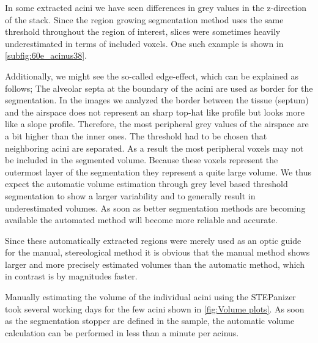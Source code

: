 \documentclass[paper=a4,twocolumn=true,DIV=calc,abstract,english]{scrartcl}
\begin{document}
In some extracted acini we have seen differences in grey values in the z-direction of the stack.
Since the region growing segmentation method uses the same threshold throughout the region of interest, slices were sometimes heavily underestimated in terms of included voxels. One such example is shown in \autoref{subfig:60e_acinus38}.

Additionally, we might see the so-called edge-effect, which can be explained as follows; 
The alveolar septa at the boundary of the acini are used as border for the segmentation.
In the images we analyzed the border between the tissue (septum) and the airspace does not represent an sharp top-hat like profile but looks more like a slope profile.
Therefore, the most peripheral grey values of the airspace are a bit higher than the inner ones.
The threshold had to be chosen  that neighboring acini are separated.
As a result the most peripheral voxels may not be included in the segmented volume.
Because these voxels represent the outermost layer of the segmentation they represent a quite large volume.
We thus expect the automatic volume estimation through grey level based threshold segmentation to show a larger variability and to generally result in underestimated volumes.
As soon as better segmentation methods are becoming available the automated method will become more reliable and accurate.

Since these automatically extracted regions were merely used as an optic guide for the manual, stereological method it is obvious that the manual method shows larger and more precisely estimated volumes than the automatic method, which in contrast is by magnitudes faster.

Manually estimating the volume of the individual acini using the STEPanizer took several working days for the few acini shown in \autoref{fig:Volume plots}.
As soon as the segmentation stopper are defined in the sample, the automatic volume calculation can be performed in less than a minute per acinus.
\end{document}
